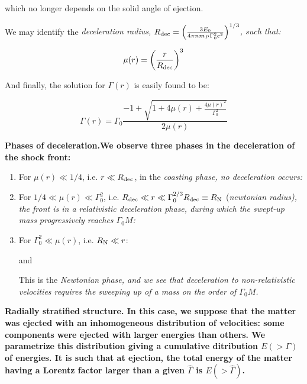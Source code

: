 which no longer depends on the solid angle of ejection.


We may identify the \it{deceleration radius}, $R_{\rm{dec}} = \left( \frac{3 E_0}{4\pi n m_P \Gamma_0^2 c^2}\right) ^ {1/3}$, such that:

$$\mu(r) = \left( \frac{r}{R_{\rm{dec}}} \right)^3 $$

And finally, the solution for $\Gamma(r)$ is easily found to be:

$$\Gamma(r) = \Gamma_0 \frac{-1 + \sqrt{1 + 4\mu(r) + \frac{4\mu(r) ^ 2}{\Gamma_0^2}}}{2 \mu(r)}$$

\bf{Phases of deceleration.}We observe three phases in the deceleration of the shock front:

\begin{enumerate}
	\item For $\mu(r) \ll 1/4$, i.e. $r \ll R_{\rm{dec}}$, in the \it{coasting phase}, no deceleration occurs:


	\item For $1/4 \ll \mu(r) \ll \Gamma_0 ^ 2$, i.e. $R_{\rm{dec}} \ll r \ll \Gamma_0^{2/3} R_{\rm{dec}} \equiv R_{\rm{N}}$ (\it{newtonian radius}), the front is in a \it{relativistic deceleration phase}, during which the swept-up mass progressively reaches $\Gamma_0 M$:



	\item For $\Gamma_0^2 \ll \mu(r)$, i.e. $ R_{\rm{N}} \ll r$:


	and


	This is the \it{Newtonian phase}, and we see that deceleration to non-relativistic velocities requires the sweeping up of a mass on the order of $\Gamma_0 M$.
\end{enumerate}

\bf{Radially stratified structure.} In this case, we suppose that the matter was ejected with an inhomogeneous distribution of velocities: some components were ejected with larger energies than others. We parametrize this distribution giving a cumulative ditribution $E( > \Gamma)$ of energies. It is such that at ejection, the total energy of the matter having a Lorentz factor larger than a given $\hat{\Gamma}$ is $E( > \hat{\Gamma})$.


